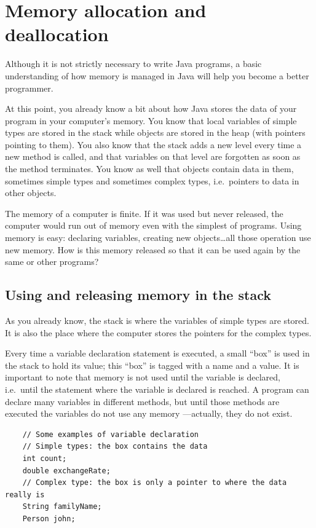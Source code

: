 \section{Memory allocation and deallocation}
\label{sec:memory-alloc-deall}

Although it is not strictly necessary to write Java programs, a basic
understanding of how memory is managed in Java will help you become a
better programmer. 

At this point, you already know a bit 
about how Java stores the data of your 
program in your computer's memory. You know that local variables of
simple types are stored in the stack while objects are stored in
the heap (with pointers pointing to them). 
You also know that the stack adds a new level every time a
new method is called, and that variables on that level are forgotten
as soon as the method terminates. You know as well that objects 
contain data in them, sometimes simple types and sometimes complex
types, i.e.~pointers to data in other objects. 

The memory of a computer is finite. If it was used but never released,
the computer would run out of memory even with the simplest of
programs. Using memory is easy: declaring variables, creating new
objects\ldots all those operation use new memory. How is this memory
released so that it can be used again by the same or other programs?

\subsection{Using and releasing memory in the stack}
\label{sec:using-rele-stack}

As you already know, the stack is where the variables of simple types
are stored. It is also the place where the computer stores the
pointers for the complex types. 

Every time a variable declaration statement is executed, 
a small ``box'' is used in the
stack to hold its value; this ``box'' is tagged
with a name and a value. It is important to note that memory is not
used until the variable is declared, i.e.~until the statement where
the variable is declared is reached. A program can declare many
variables in different methods, but until those methods are executed
the variables do not use any memory ---actually, they do not exist. 

\begin{verbatim}
    // Some examples of variable declaration
    // Simple types: the box contains the data
    int count;
    double exchangeRate;
    // Complex type: the box is only a pointer to where the data really is
    String familyName;
    Person john;
\end{verbatim}

